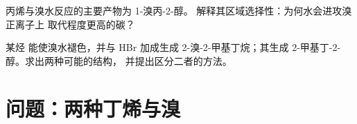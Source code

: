 \begin{exercise}[$\star\star\star$]\label{exo:b1:electrophilic-additions:11}
丙烯与溴水反应的主要产物为 1-溴丙-2-醇。
解释其区域选择性：为何水会进攻溴正离子上
取代程度更高的碳？
\end{exercise}

\begin{exercise}[$\star\star\star$]\label{exo:b1:electrophilic-additions:12}
某烃  能使溴水褪色，并与 HBr 加成生成
2-溴-2-甲基丁烷；其生成 2-甲基丁-2-醇。求出两种可能的结构，
并提出区分二者的方法。
\end{exercise}

\section{问题：两种丁烯与溴}

